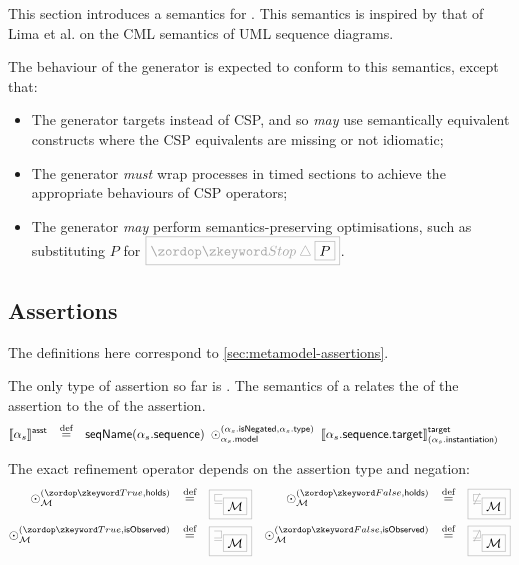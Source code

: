 
This section introduces a \tockcsp{} semantics for \langname.
This semantics is inspired by that of Lima et al. on the CML semantics of
UML sequence diagrams.

The behaviour of the \langname{} generator is expected to conform to
this semantics, except that:

\begin{itemize}
\item
	The generator targets \cspm{} instead of CSP, and so \emph{may}
	use semantically equivalent \cspm{} constructs where the CSP equivalents
	are missing or not idiomatic;
\item
	The generator \emph{must}  wrap processes in
	timed sections to achieve the appropriate \tockcsp{} behaviours of
	CSP operators;
\item
	The generator \emph{may} perform semantics-preserving optimisations,
	such as substituting \(P\) for \(\tlang{\Stop \interrupt \olang{P}}\).
\end{itemize}


\subsection{Assertions}

The definitions here correspond to \cref{sec:metamodel-assertions}.

\begin{defn}[\massertion]

\newcommand{\refop}[3]{\mathbin{\odot_{#1}^{(#2, #3)}}}

The only type of assertion so far is \msequenceassertion.  The semantics of a
\msequenceassertion{} relates the \msequence{} of the assertion to the
\mtarget{} of the assertion.
%
\begin{align*}
	\asstsema{\asasst}
\quad\defeq\quad&
	\seqnameOf{\field{\asasst}{sequence}}
	\;
	\refop{\field{\asasst}{model}}{\field{\asasst}{isNegated}}{\field{\asasst}{type}}
	\;
	\targetsema{\field{\field{\asasst}{sequence}}{target}}{\field{\asasst}{instantiation}}
\end{align*}

The exact refinement operator depends on the assertion type and negation:
%
\begin{align*}
	\refop{\amodel}{\true}{\mathsf{holds}}
\quad\defeq\quad&
	\tlang{\sqsubseteq_{\olang{\amodel}}}
&
	\refop{\amodel}{\false}{\mathsf{holds}}
\quad\defeq\quad&
	\tlang{\not\sqsubseteq_{\olang{\amodel}}}
\\
	\refop{\amodel}{\true}{\mathsf{isObserved}}
\quad\defeq\quad&
	\tlang{\sqsupseteq_{\olang{\amodel}}}
&
	\refop{\amodel}{\false}{\mathsf{isObserved}}
\quad\defeq\quad&
	\tlang{\not\sqsupseteq_{\olang{\amodel}}}
\\
\end{align*}
\end{defn}


